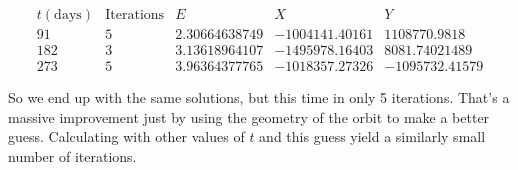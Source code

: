 \documentclass[11pt,letterpaper]{article}
\begin{document}
\[
\begin{array}{ccccc}
t(\text{days}) & \text{Iterations} & E & X & Y \\
91 & 5 & 2.30664638749 & -1004141.40161 & 1108770.9818 \\
182 & 3 & 3.13618964107 & -1495978.16403 & 8081.74021489 \\
273 & 5 & 3.96364377765 & -1018357.27326 & -1095732.41579
\end{array}
\]

So we end up with the same solutions, but this time in only 5 iterations. That's a massive improvement just by using the geometry of the orbit to make a better guess. Calculating with other values of $t$ and this guess yield a similarly small number of iterations.
\end{document}
